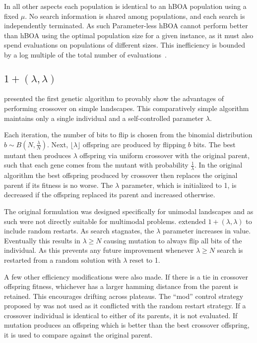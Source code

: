 \documentclass[twoside]{article}
\begin{document}
In all other aspects each population is identical to an hBOA population using a fixed $\mu$. No search information
is shared among populations, and each search is independently terminated. As such Parameter-less hBOA cannot
perform better than hBOA using the optimal population size for a given instance, as it must also spend evaluations
on populations of different sizes. This inefficiency is bounded by a log multiple of the total number of
evaluations~\citep{pelikan:1999:worstparameter-less}.

\subsection{$1+(\lambda, \lambda)$}
\cite{doerr:2013:lambdalambda} presented the first genetic algorithm to provably show
the advantages of performing crossover on simple landscapes. This comparatively simple
algorithm maintains only a single individual and a self-controlled parameter $\lambda$.

Each iteration, the number of bits to flip is chosen from the binomial distribution $b\sim B(N, \frac{\lambda}{N})$.
Next, $\lfloor\lambda\rfloor$ offspring are produced by flipping $b$ bits. The
best mutant then produces $\lambda$ offspring via uniform crossover with the original parent, such that each gene comes from the
mutant with probability $\frac{1}{\lambda}$. In the original algorithm the best
offspring produced by crossover then replaces the original parent if its fitness is no worse.
The $\lambda$ parameter, which is initialized to 1, is decreased if the offspring replaced
its parent and increased otherwise.

The original formulation was designed specifically for unimodal landscapes and as such were
not directly suitable for multimodal problems. \cite{goldman:2014:p3} extended $1+(\lambda, \lambda)$
to include random restarts. As search stagnates, the $\lambda$ parameter increases in value. Eventually
this results in $\lambda \ge N$ causing mutation to always flip all bits of the individual.
As this prevents any future improvement whenever $\lambda \ge N$ search is restarted from a random solution with $\lambda$
reset to 1.

A few other efficiency modifications were also made. If there is a tie in crossover offspring fitness,
whichever has a larger hamming distance from the parent is retained. This encourages drifting across plateaus.
The ``mod'' control strategy proposed by \cite{doerr:2013:lambdalambda} was not used as it conflicted with
the random restart strategy.
If a crossover individual is identical to either of its parents, it is not evaluated.
If mutation produces an offspring which is better than the best crossover offspring, it is used to compare
against the original parent.
\end{document}
